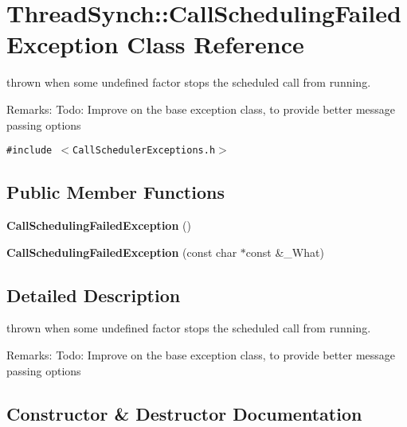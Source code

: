 \section{Thread\-Synch::Call\-Scheduling\-Failed\-Exception Class Reference}
\label{class_thread_synch_1_1_call_scheduling_failed_exception}
thrown when some undefined factor stops the scheduled call from running. \begin{Desc}
\item[Remarks:]Todo: Improve on the base exception class, to provide better message passing options \end{Desc}
 


{\tt \#include $<$Call\-Scheduler\-Exceptions.h$>$}

\subsection*{Public Member Functions}
\begin{CompactItemize}
\item 
{\bf Call\-Scheduling\-Failed\-Exception} ()
\item 
{\bf Call\-Scheduling\-Failed\-Exception} (const char $\ast$const \&\_\-What)
\end{CompactItemize}


\subsection{Detailed Description}
thrown when some undefined factor stops the scheduled call from running. \begin{Desc}
\item[Remarks:]Todo: Improve on the base exception class, to provide better message passing options \end{Desc}




\subsection{Constructor \& Destructor Documentation}
